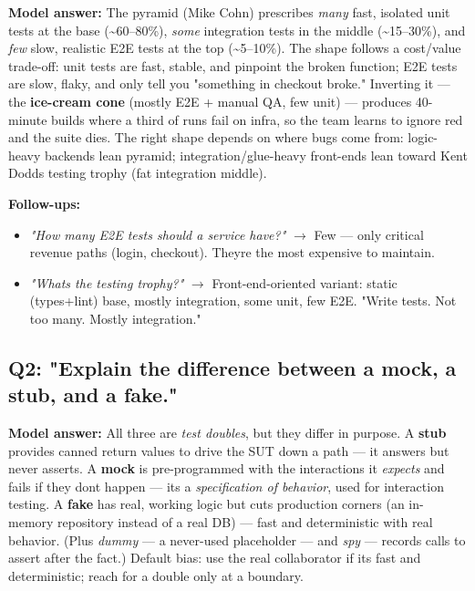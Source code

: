 \documentclass[11pt]{article}
\providecommand{\tightlist}{\setlength{\itemsep}{1pt}\setlength{\parskip}{0pt}}
\begin{document}
\textbf{Model answer:} The pyramid (Mike Cohn) prescribes \emph{many} fast, isolated unit tests at the base (\textasciitilde60--80\%), \emph{some} integration tests in the middle (\textasciitilde15--30\%), and \emph{few} slow, realistic E2E tests at the top (\textasciitilde5--10\%). The shape follows a cost/value trade-off: unit tests are fast, stable, and pinpoint the broken function; E2E tests are slow, flaky, and only tell you "something in checkout broke." Inverting it --- the \textbf{ice-cream cone} (mostly E2E + manual QA, few unit) --- produces 40-minute builds where a third of runs fail on infra, so the team learns to ignore red and the suite dies. The right shape depends on where bugs come from: logic-heavy backends lean pyramid; integration/glue-heavy front-ends lean toward Kent Dodds\textquotesingle{} testing trophy (fat integration middle).

\textbf{Follow-ups:}

\begin{itemize}
\tightlist
\item
  \emph{"How many E2E tests should a service have?"} \(\rightarrow\) Few --- only critical revenue paths (login, checkout). They\textquotesingle re the most expensive to maintain.
\item
  \emph{"What\textquotesingle s the testing trophy?"} \(\rightarrow\) Front-end-oriented variant: static (types+lint) base, mostly integration, some unit, few E2E. "Write tests. Not too many. Mostly integration."
\end{itemize}

\subsection{Q2: "Explain the difference between a mock, a stub, and a fake."}\label{q2-explain-the-difference-between-a-mock-a-stub-and-a-fake}

\textbf{Model answer:} All three are \emph{test doubles}, but they differ in purpose. A \textbf{stub} provides canned return values to drive the SUT down a path --- it answers but never asserts. A \textbf{mock} is pre-programmed with the interactions it \emph{expects} and fails if they don\textquotesingle t happen --- it\textquotesingle s a \emph{specification of behavior}, used for interaction testing. A \textbf{fake} has real, working logic but cuts production corners (an in-memory repository instead of a real DB) --- fast and deterministic with real behavior. (Plus \emph{dummy} --- a never-used placeholder --- and \emph{spy} --- records calls to assert after the fact.) Default bias: use the real collaborator if it\textquotesingle s fast and deterministic; reach for a double only at a boundary.
\end{document}
